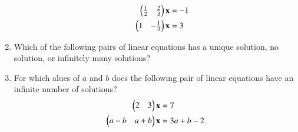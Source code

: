 \begin{enumerate}[label=\arabic*.,ref=\thesubsection.\theenumi]
\begin{enumerate}[itemsep=2pt]
\begin{multicols}{2}
\begin{align}
\begin{split}
\begin{pmatrix}\frac{1}{2} & \frac{2}{3} \end{pmatrix}\mathbf{x}&=-1
\\
\begin{pmatrix}{1} & -\frac{1}{3} \end{pmatrix}\mathbf{x}&=3
\end{split}
\end{align}
\end{multicols}
\end{enumerate}
%
%
\item Which of the following pairs of linear equations has a unique solution, no solution, or infinitely many solutions?
%
\begin{enumerate}[itemsep=2pt]
\end{enumerate}
%
\item For which alues of $a$ and $b$ does the following pair of linear equations have an infinite number of solutions?
\begin{align}
\begin{split}
\begin{pmatrix}2 & 3 \end{pmatrix}\mathbf{x}&=7
\\
\begin{pmatrix}a-b & a+b \end{pmatrix}\mathbf{x}&=3a+b-2
\end{split}
\end{align}
\solution 



\end{enumerate}
